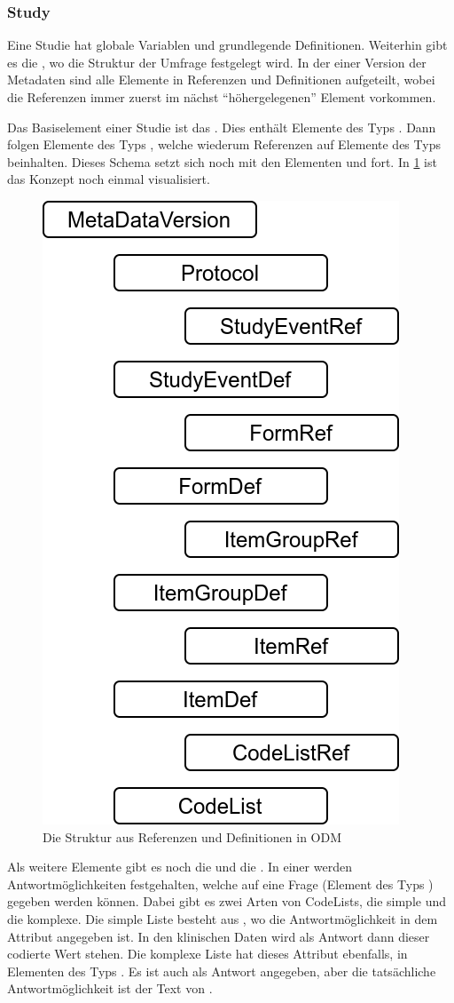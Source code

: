 \subsubsection{Study}

Eine Studie hat globale Variablen und grundlegende Definitionen.
Weiterhin gibt es die , wo die Struktur der Umfrage festgelegt wird.
In der einer Version der Metadaten sind alle Elemente in Referenzen und Definitionen aufgeteilt, wobei die Referenzen immer zuerst im nächst \enquote{höhergelegenen} Element vorkommen.

Das Basiselement einer Studie ist das .
Dies enthält Elemente des Typs .
Dann folgen Elemente des Typs , welche wiederum Referenzen auf Elemente des Typs  beinhalten.
Dieses Schema setzt sich noch mit den Elementen  und  fort.
In \cref{fig:odm_ex} ist das Konzept noch einmal visualisiert.

\begin{figure}[h]
			\centering
			\includegraphics[width=.40\textwidth]{./img/met_odm.png}
			\caption{Die Struktur aus Referenzen und Definitionen in ODM}
			\label{fig:odm_ex}
\end{figure}

Als weitere Elemente gibt es noch die  und die .
In einer  werden Antwortmöglichkeiten festgehalten, welche auf eine Frage (Element des Typs ) gegeben werden können.
Dabei gibt es zwei Arten von CodeLists, die simple und die komplexe.
Die simple Liste besteht aus , wo die Antwortmöglichkeit in dem Attribut  angegeben ist.
In den klinischen Daten wird als Antwort dann dieser codierte Wert stehen.
Die komplexe Liste hat dieses Attribut ebenfalls, in Elementen des Typs . Es ist auch als Antwort angegeben, aber die tatsächliche Antwortmöglichkeit ist der Text von .

